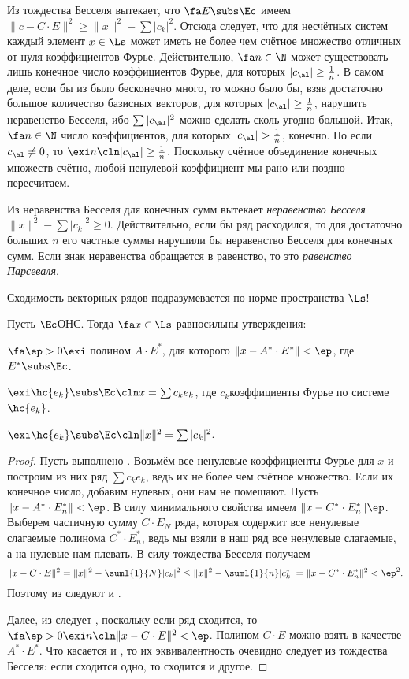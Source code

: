 \documentclass[a4paper]{article}
\begin{document}
Из тождества Бесселя вытекает, что $\fa E \subs \Ec$ имеем $\|c - C\cdot E\|^2 \ge \|x\|^2 - \sum |c_k|^2$.
Отсюда следует, что для несчётных систем каждый элемент $x \in \Ls$ может иметь не более чем
счётное множество отличных от нуля коэффициентов Фурье. Действительно, $\fa n \in \N$ может
существовать лишь конечное число коэффициентов Фурье, для которых $|c_\al| \ge \frac{1}{n}$.
В самом деле, если бы из было бесконечно много, то можно было бы, взяв достаточно большое
количество базисных векторов, для которых $|c_\al| \ge \frac{1}{n}$,
нарушить неравенство Бесселя, ибо $\sum |c_\al|^2$ можно сделать сколь угодно большой. Итак,
$\fa n \in \N$ число коэффициентов, для которых
$|c_\al| > \frac{1}{n}$, конечно. Но если $c_\al \neq 0$, то $\exi n\cln |c_\al| \ge \frac{1}{n}$.
Поскольку счётное объединение конечных множеств счётно,
любой ненулевой коэффициент мы рано или поздно пересчитаем.

Из неравенства Бесселя для конечных сумм вытекает \emph{неравенство Бесселя}
$\|x\|^2 - \sum |c_k|^2 \ge 0$. Действительно, если бы ряд расходился, то для достаточно
больших $n$ его частные суммы нарушили бы неравенство Бесселя для конечных сумм.
Если знак неравенства обращается в равенство, то это \emph{равенство Парсеваля}.

\begin{note}
Сходимость векторных рядов подразумевается по норме пространства $\Ls$!
\end{note}

\begin{theorem}
Пусть $\Ec$\т ОНС. Тогда $\fa x \in \Ls$ равносильны утверждения:

 $\fa \ep > 0 \exi$ полином $A\cdot E^*$, для которого $\|x - A^*\cdot E^*\|< \ep$, где $E^* \subs \Ec$.

 $\exi \hc{e_k} \subs \Ec\cln x = \sum c_k e_k$, где $c_k$\т коэффициенты Фурье по системе $\hc{e_k}$.

 $\exi \hc{e_k} \subs \Ec\cln \|x\|^2 = \sum |c_k|^2$.
\end{theorem}
\begin{proof}
Пусть выполнено . Возьмём все ненулевые коэффициенты Фурье для $x$ и построим из них ряд $\sum c_k e_k$,
ведь их не более чем счётное множество. Если их конечное число, добавим нулевых, они нам не помешают.
Пусть $\|x - A^*\cdot E^*_n\| < \ep$. В силу минимального свойства имеем $\|x-C^*\cdot E^*_n\| \ep$.
Выберем частичную сумму $C\cdot E_N$ ряда, которая содержит все ненулевые слагаемые
полинома $C^*\cdot E^*_n$, ведь мы взяли в наш ряд все ненулевые слагаемые, а на нулевые нам
плевать. В силу тождества Бесселя получаем
$$\|x - C\cdot E\|^2 = \|x\|^2 - \suml{1}{N}|c_k|^2 \le \|x\|^2 - \suml{1}{n}|c_k^*|=
\|x-C^*\cdot E^*_n\|^2 < \ep^2.$$
Поэтому из  следуют  и .

Далее, из  следует , поскольку если ряд сходится, то
$\fa \ep > 0 \exi n\cln \|x - C\cdot E\|^2 < \ep$. Полином $C\cdot E$
можно взять в качестве $A^*\cdot E^*$. Что касается  и , то их эквивалентность
очевидно следует из тождества Бесселя: если сходится одно, то сходится и другое.
\end{proof}
\end{document}

